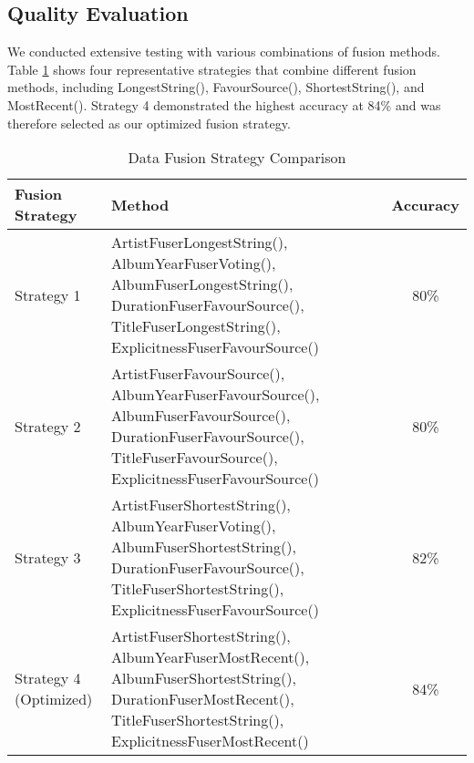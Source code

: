 \documentclass[runningheads]{llncs}
\begin{document}
\subsection{Quality Evaluation}
We conducted extensive testing with various combinations of fusion methods. Table \ref{tab:fusion-strategies} shows four representative strategies that combine different fusion methods, including LongestString(), FavourSource(), ShortestString(), and MostRecent(). Strategy 4 demonstrated the highest accuracy at 84\% and was therefore selected as our optimized fusion strategy.

\begin{table}[h!]
\setlength{\tabcolsep}{4pt}
\small
\caption{Data Fusion Strategy Comparison}
\label{tab:fusion-strategies}
\begin{threeparttable}
\begin{tabular}{p{2.5cm}p{7.5cm}c}
\hline
\textbf{Fusion Strategy} & \textbf{Method} & \textbf{Accuracy} \\ \hline
Strategy 1 & \raggedright ArtistFuserLongestString(), \newline
AlbumYearFuserVoting(), \newline
AlbumFuserLongestString(), \newline
DurationFuserFavourSource(), \newline
TitleFuserLongestString(), \newline
ExplicitnessFuserFavourSource() & 80\% \\
\hline
Strategy 2 & \raggedright ArtistFuserFavourSource(), \newline
AlbumYearFuserFavourSource(), \newline
AlbumFuserFavourSource(), \newline
DurationFuserFavourSource(), \newline
TitleFuserFavourSource(), \newline
ExplicitnessFuserFavourSource() & 80\% \\
\hline
Strategy 3 & \raggedright ArtistFuserShortestString(), \newline
AlbumYearFuserVoting(), \newline
AlbumFuserShortestString(), \newline
DurationFuserFavourSource(), \newline
TitleFuserShortestString(), \newline
ExplicitnessFuserFavourSource() & 82\% \\
\hline
\rowcolor[HTML]{FFFFCC}
Strategy 4 \newline (Optimized) & \raggedright ArtistFuserShortestString(), \newline
AlbumYearFuserMostRecent(), \newline
AlbumFuserShortestString(), \newline
DurationFuserMostRecent(), \newline
TitleFuserShortestString(), \newline
ExplicitnessFuserMostRecent() & 84\% \\ \hline
\end{tabular}
\end{threeparttable}
\end{table}
\end{document}
